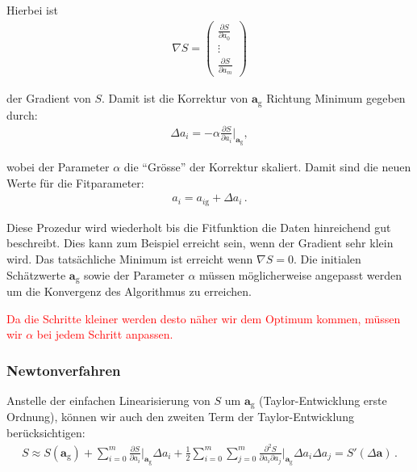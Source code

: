 Hierbei ist
\begin{align}
\nabla S =
\begin{pmatrix}
\frac{\partial S}{\partial a_0} \\
\vdots \\
\frac{\partial S}{\partial a_m}
\end{pmatrix}
\label{eq:vl9-4}
\end{align}

der Gradient von $S$. Damit ist die Korrektur von $\boldsymbol{a}_\mathrm{g}$ Richtung Minimum gegeben durch:
\begin{align}
\Delta a_i = - \alpha \frac{ \partial S }{ \partial a_i } \bigg|_{\boldsymbol{a}_\mathrm{g}},
\label{eq:vl9-5}
\end{align}

wobei der Parameter $\alpha$ die ``Gr\"osse'' der Korrektur skaliert. Damit sind die neuen Werte f\"ur die Fitparameter:
\begin{align}
a_i = a_{i\mathrm{g}} + \Delta a_i\,.
\label{eq:vl9-6}
\end{align}

Diese Prozedur wird wiederholt bis die Fitfunktion die Daten hinreichend gut beschreibt. Dies kann zum Beispiel erreicht sein, wenn der Gradient sehr klein wird. Das tats\"achliche Minimum ist erreicht wenn $\nabla S = 0$. Die initialen Sch\"atzwerte $\boldsymbol{a}_\mathrm{g}$ sowie der Parameter $\alpha$ m\"ussen m\"oglicherweise angepasst werden um die Konvergenz des Algorithmus zu erreichen.

\begin{center}
\textcolor{red}{Da die Schritte kleiner werden desto n\"aher wir dem Optimum kommen, m\"ussen wir $\alpha$ bei jedem Schritt anpassen.}
\end{center}


\subsubsection{Newtonverfahren}
\label{subsubsec:vl9-2}

Anstelle der einfachen Linearisierung von $S$ um $\boldsymbol{a}_\mathrm{g}$ (Taylor-Entwicklung erste Ordnung), k\"onnen wir auch den zweiten Term der Taylor-Entwicklung ber\"ucksichtigen:
\begin{align}
S \approx S(\boldsymbol{a}_\mathrm{g}) + \sum_{i=0}^m \frac{ \partial S }{ \partial a_i } \bigg|_{\boldsymbol{a}_\mathrm{g}} \Delta a_i + \frac{1}{2} \sum_{i=0}^m \sum_{j=0}^m \frac{ \partial^2 S }{ \partial a_i \partial a_j } \bigg|_{\boldsymbol{a}_\mathrm{g}} \Delta a_i \Delta a_j = S'(\Delta \boldsymbol{a}) \,.
\label{eq:vl9-7}
\end{align}

